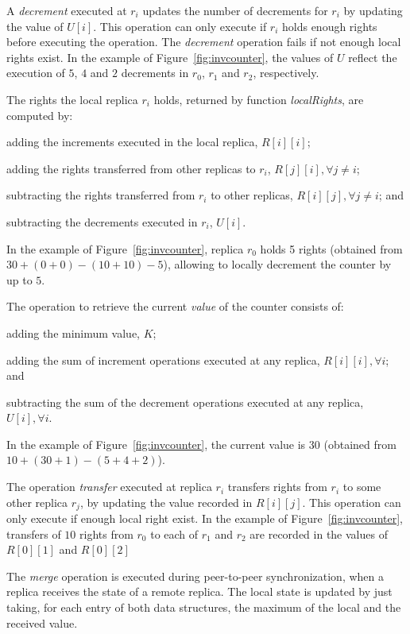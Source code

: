 \documentclass[conference]{IEEEtran}
\begin{document}
A \emph{decrement} executed at $r_i$ updates the number of 
decrements for $r_i$ by updating the value of $U[i]$. 
This operation can only execute if $r_i$ holds enough rights before executing
the operation. The \emph{decrement} operation fails if not enough local rights exist.
In the example of Figure~\ref{fig:invcounter}, the values of $U$ reflect the 
execution of $5$, $4$ and $2$ decrements in $r_0$, $r_1$ and $r_2$, respectively.

The rights the local replica $r_i$ holds, returned by function \emph{localRights},
are computed by:
\begin{inparaenum}[(a)]
\item adding the increments executed in the local replica, $R[i][i]$;
\item adding the rights transferred from other replicas to $r_i$, $R[j][i], \forall j \neq i$;
\item subtracting the rights transferred from $r_i$ to other replicas, $R[i][j], \forall j \neq i$; and
\item subtracting the decrements executed in $r_i$, $U[i]$.
\end{inparaenum}  
In the example of Figure~\ref{fig:invcounter}, replica $r_0$ holds 5 rights
(obtained from $30 + (0 + 0) - (10 + 10) - 5$), allowing to locally decrement the counter
by up to $5$.

The operation to retrieve the current \emph{value} of the counter consists 
of:
\begin{inparaenum}[(a)]
\item adding the minimum value, $K$;
\item adding the sum of increment operations executed at any replica, $R[i][i], \forall i$; and
\item subtracting the sum of the decrement operations executed at any replica, $U[i], \forall i$.
\end{inparaenum} 
In the example of Figure~\ref{fig:invcounter}, the current value is $30$ (obtained from $10 + (30 + 1) - (5 + 4 + 2)$).

The operation \emph{transfer} executed at replica $r_i$  
transfers rights from $r_i$ to some other replica $r_j$, by updating the
value recorded in $R[i][j]$.
This operation can only execute if enough local right exist.
In the example of Figure~\ref{fig:invcounter}, transfers of $10$ rights from 
$r_0$ to each of $r_1$ and $r_2$ are recorded in the values of $R[0][1]$ and $R[0][2]$

The \emph{merge} operation is executed during peer-to-peer synchronization,
when a replica receives the state of a remote replica. 
The local state is updated by just taking, for each entry of both data structures, 
the maximum of the local and the received value.
\end{document}
